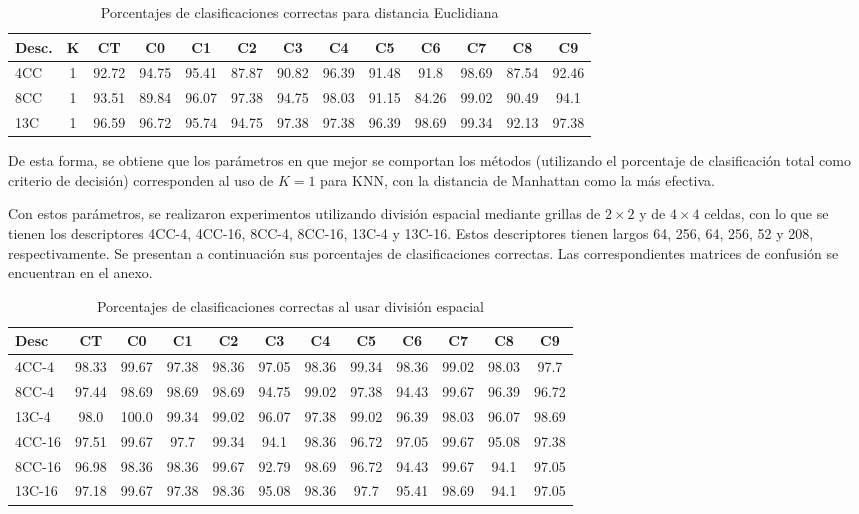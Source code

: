 \documentclass[12pt]{article}
\begin{document}
\begin{table}[H]
\begin{tabular}{|l|c|c|c|c|c|c|c|c|c|c|c|c|}
\hline
\textbf{Desc.}&\textbf{K}&\textbf{CT}&\textbf{C0}&\textbf{C1}&\textbf{C2}&\textbf{C3}&\textbf{C4}&\textbf{C5}&\textbf{C6}&\textbf{C7}&\textbf{C8}&\textbf{C9}\\
\hline
4CC&1&92.72&94.75&95.41&87.87&90.82&96.39&91.48&91.8&98.69&87.54&92.46\\
\hline
8CC&1&93.51&89.84&96.07&97.38&94.75&98.03&91.15&84.26&99.02&90.49&94.1\\
\hline
13C&1&96.59&96.72&95.74&94.75&97.38&97.38&96.39&98.69&99.34&92.13&97.38\\
\hline
\end{tabular}
\caption{Porcentajes de clasificaciones correctas para distancia Euclidiana}
\end{table}

De esta forma, se obtiene que los parámetros en que mejor se comportan los
métodos (utilizando el porcentaje de clasificación total como criterio de
decisión) corresponden al uso de $K=1$ para KNN, con la distancia de Manhattan
como la más efectiva.

Con estos parámetros, se realizaron experimentos utilizando división espacial
mediante grillas de $2 \times 2$ y de $4 \times 4$ celdas, con lo que se tienen
los descriptores 4CC-4, 4CC-16, 8CC-4, 8CC-16, 13C-4 y 13C-16. Estos
descriptores tienen largos 64, 256, 64, 256, 52 y 208, respectivamente. Se
presentan a continuación sus porcentajes de clasificaciones correctas. Las
correspondientes matrices de confusión se encuentran en el anexo.

\begin{table}[H]
\begin{tabular}{|l|c|c|c|c|c|c|c|c|c|c|c|}
\hline
\textbf{Desc}&\textbf{CT}&\textbf{C0}&\textbf{C1}&\textbf{C2}&\textbf{C3}&\textbf{C4}&\textbf{C5}&\textbf{C6}&\textbf{C7}&\textbf{C8}&\textbf{C9}\\
\hline
4CC-4&98.33&99.67&97.38&98.36&97.05&98.36&99.34&98.36&99.02&98.03&97.7\\
\hline
8CC-4&97.44&98.69&98.69&98.69&94.75&99.02&97.38&94.43&99.67&96.39&96.72\\
\hline
13C-4&98.0&100.0&99.34&99.02&96.07&97.38&99.02&96.39&98.03&96.07&98.69\\
\hline
4CC-16&97.51&99.67&97.7&99.34&94.1&98.36&96.72&97.05&99.67&95.08&97.38\\
\hline
8CC-16&96.98&98.36&98.36&99.67&92.79&98.69&96.72&94.43&99.67&94.1&97.05\\
\hline
13C-16&97.18&99.67&97.38&98.36&95.08&98.36&97.7&95.41&98.69&94.1&97.05\\
\hline\end{tabular}
\caption{Porcentajes de clasificaciones correctas al usar división espacial}
\end{table}
\end{document}

